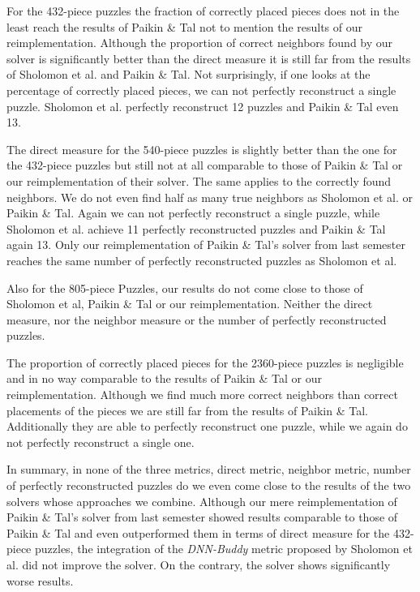 \documentclass[11pt]{report}
\begin{document}
For the 432-piece puzzles the fraction of correctly placed pieces does not in
the least reach the results of Paikin \& Tal not to mention the results of our
reimplementation. Although the proportion of correct neighbors found by our
solver is significantly better than the direct measure it is still far from the
results of Sholomon et al. and Paikin \& Tal.
Not surprisingly, if one looks at the percentage of correctly placed pieces, we
can not perfectly reconstruct a single puzzle. Sholomon et al. perfectly
reconstruct 12 puzzles and Paikin \& Tal even 13. 

The direct measure for the 540-piece puzzles is slightly better than the one for
the 432-piece puzzles but still not at all comparable to those of Paikin \& Tal
or our reimplementation of their solver. The same applies to the correctly found
neighbors. We
do not even find half as many true neighbors as Sholomon et al. or Paikin \&
Tal. Again we can not perfectly reconstruct a single puzzle, while Sholomon et
al. achieve 11 perfectly reconstructed puzzles and Paikin \& Tal again 13. Only
our reimplementation of Paikin \& Tal's solver from last semester reaches the same number of
perfectly reconstructed puzzles as Sholomon et al.

Also for the 805-piece Puzzles, our results do not come close to those of
Sholomon et al, Paikin \& Tal or our reimplementation. Neither the direct
measure, nor the neighbor measure or the number of perfectly reconstructed
puzzles.

The proportion of correctly placed pieces for the 2360-piece puzzles is
negligible and in no way comparable to the results of Paikin \& Tal or our
reimplementation. Although we find much more correct neighbors than
correct placements of the pieces we are still far from the results of Paikin \&
Tal. Additionally they are able to perfectly reconstruct one puzzle, while we
again do not perfectly reconstruct a single one.

In summary, in none of the three metrics, direct metric, neighbor metric, number
of perfectly reconstructed puzzles do we even come close to the results of the
two solvers whose approaches we combine. Although our mere reimplementation of
Paikin \& Tal's solver from last semester showed results comparable to those of
Paikin \& Tal and even outperformed them in terms of direct measure for the
432-piece puzzles, the integration of the \textit{DNN-Buddy} metric proposed by
Sholomon et al. did not improve the solver. On the contrary, the solver shows
significantly worse results.
\end{document}
